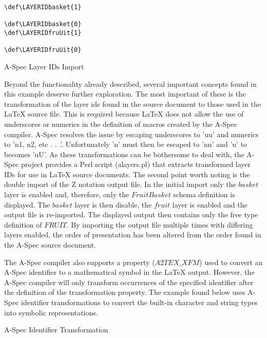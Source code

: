 \documentclass[letterpaper,10pt,draft]{book}
\begin{document}
\begin{example}
\begin{verbatim}
\def\LAYERIDbasket{1}

\def\LAYERIDbasket{0}
\def\LAYERIDfruUit{1}

\def\LAYERIDfruUit{0}
\end{verbatim}

   \caption{A-Spec Layer IDs Import}
   \label{ex:LayerIDTeX}
\end{example}

Beyond the functionality already described, several important concepts found in
this example deserve further exploration.  The most important of these is the transformation
of the layer ids found in the source document to those used in the \LaTeX{} source
file.  This is required because \LaTeX{} does not allow the use of underscores or
numerics in the definition of macros created by the A-Spec compiler.  A-Spec resolves
the issue by escaping underscores to 'uu' and numerics to 'n1, n2, etc . . .'.
Unfortunately 'n' must then be escaped to 'nn' and 'u' to becomes 'uU'.  As these
transformations can be bothersome to deal with, the A-Spec project provides a Perl
script (alayers.pl) that extracts transformed layer IDs for use in \LaTeX{} source
documents.  The second point worth noting is the double import of the Z notation
output file.  In the initial import only the $basket$ layer is enabled and, therefore,
only the $FruitBasket$ schema definition is displayed.  The $basket$ layer is then
disable, the $fruit$ layer is enabled and the output file is re-imported.  The displayed
output then contains only the free type definition of $FRUIT$.  By importing the
output file multiple times with differing layers enabled, the order of presentation
has been altered from the order found in the A-Spec source document.

The A-Spec compiler also supports a property ($A2TEX\_XFM$) used to convert an A-Spec
identifier to a mathematical symbol in the \LaTeX{} output.  However, the A-Spec
compiler will only transform occurrences of the specified identifier after the definition
of the transformation property.  The example found below uses A-Spec identifier
transformations to convert the built-in character and string types into symbolic
representations.

\begin{example}
\begin{minipage}[t]{0.49\linewidth}
   
\end{minipage}
\begin{minipage}[t]{0.49\linewidth}
   \azbox
   
\end{minipage}

   \caption{A-Spec Identifier Transformation}
   \label{ex:OzXfm}
\end{example}
\end{document}
